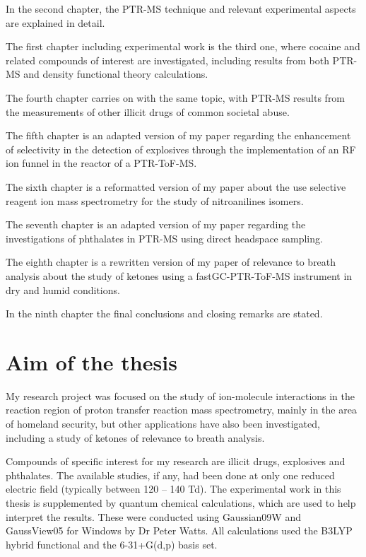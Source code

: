 
In the second chapter, the PTR-MS technique %
and relevant experimental aspects are explained in detail.

The first chapter including experimental work is the third one, where cocaine and related compounds of interest are investigated, including results from both PTR-MS and density functional theory calculations.

The fourth chapter  carries on with the same topic, with PTR-MS results from the measurements of other illicit drugs of common societal abuse.

The fifth chapter is an adapted version of my  paper regarding the enhancement of selectivity in the detection of %
explosives
through the implementation of an RF ion funnel in the reactor of a PTR-ToF-MS.

The sixth chapter is a reformatted version of my  paper about the use selective reagent ion mass spectrometry for the study of nitroanilines isomers.

The seventh chapter is an adapted version of my  paper regarding the investigations of phthalates in PTR-MS using direct headspace sampling.

The eighth chapter is a rewritten version of my  paper of relevance to breath analysis about the study of ketones using a fastGC-PTR-ToF-MS instrument %
in dry and humid conditions.

In the ninth chapter the final conclusions and closing remarks are stated.




\section{Aim of the thesis}
My research project was focused on the study of ion-molecule interactions in the reaction region of proton transfer reaction mass spectrometry,  mainly in the area of homeland security, but other applications have also been investigated, including a study of ketones of relevance to breath analysis.

Compounds of specific interest for my research are  illicit drugs, explosives and phthalates. The available studies, if any, had been done at only one reduced electric field (typically between 120 – 140 Td). The experimental work in this thesis  is supplemented by quantum chemical calculations, which are used to help interpret the results. These were conducted using Gaussian09W and GaussView05 for Windows by Dr Peter Watts. All calculations used the B3LYP hybrid functional and the 6-31+G(d,p) basis set.

